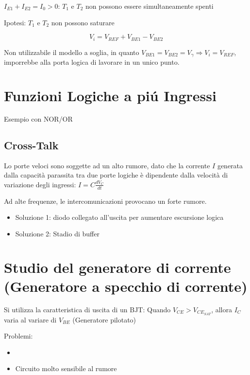 \documentclass{article}
\begin{document}
$I_{E1} + I_{E2} = I_0 > 0$:
$T_1$ e $T_2$ non possono essere simultaneamente spenti

Ipotesi: $T_1$ e $T_2$ non possono saturare

\[ V_i = V_{REF} + V_{BE1} - V_{BE2} \]

Non utilizzabile il modello a soglia, in quanto $V_{BE1} = V_{BE2} = V_\gamma \Rightarrow V_i = V_{REF}$, imporrebbe alla porta logica di lavorare in un unico punto.

\section{Funzioni Logiche a pi\'u Ingressi}
Esempio con NOR/OR
\subsection*{Cross-Talk}
Lo porte veloci sono soggette ad un alto rumore, dato che la corrente $I$ generata dalla capacità parassita tra due porte logiche è dipendente dalla velocità di variazione degli ingressi: $I = C\frac{dV_C}{dt}$

Ad alte frequenze, le intercomunicazioni provocano un forte rumore.

\begin{itemize}
    \item Soluzione 1: diodo collegato all'uscita per aumentare escursione logica
    \item Soluzione 2: Stadio di buffer
\end{itemize}

\section{Studio del generatore di corrente (Generatore a specchio di corrente)}
Si utilizza la caratteristica di uscita di un  BJT: Quando $V_{CE} > V_{CE_{SAT}}$, allora $I_C$ varia al variare di $V_{BE}$ (Generatore pilotato)

Problemi:
\begin{itemize}
    \item
    \item Circuito molto sensibile al rumore
\end{itemize}
\end{document}
